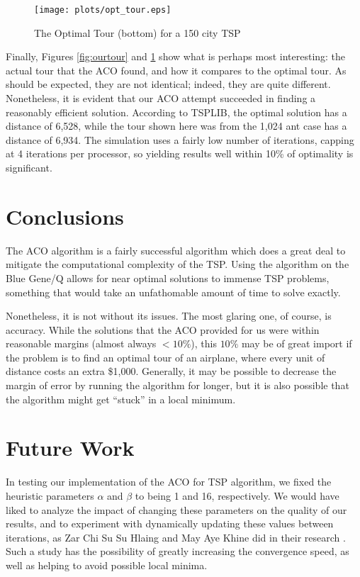 \documentclass[twocolumn]{article}
\begin{document}
\begin{figure}[t]
  \centering
  \texttt{[image: plots/opt\_tour.eps]}
  \caption{The Optimal Tour (bottom) for a 150 city TSP} 
  \label{fig:opttour}
\end{figure}

Finally, Figures \ref{fig:ourtour} and \ref{fig:opttour} show what is perhaps 
most interesting: the actual tour that the ACO found, and how it compares to 
the optimal tour. As should be expected, they are not identical; indeed, 
they are quite different. Nonetheless, it is evident that our ACO attempt succeeded
in finding a reasonably efficient solution. According to TSPLIB, the optimal solution
has a distance of 6,528, while the tour shown here was from the 1,024 ant case
has a distance of 6,934. The simulation uses a fairly low number of iterations, 
capping at 4 iterations per processor, so yielding results well within 10\% of
optimality is significant. 

\section{Conclusions}

The ACO algorithm is a fairly successful algorithm which does a great deal to 
mitigate the computational complexity of the TSP. Using the algorithm on the
Blue Gene/Q allows for near optimal solutions to immense TSP problems, something
that would take an unfathomable amount of time to solve exactly. 

Nonetheless, it is not without its issues. The most glaring one, of course,
is accuracy. While the solutions that the ACO provided for us were within
reasonable margins (almost always $<10\%$), this $10\%$ may be of great 
import if the problem is to find an optimal tour of an airplane, where every
unit of distance costs an extra \$1,000. Generally, it may be possible to 
decrease the margin of error by running the algorithm for longer, but 
it is also possible that the algorithm might get ``stuck'' in a local 
minimum. 

\section{Future Work}

In testing our implementation of the ACO for TSP algorithm, we fixed the 
heuristic parameters $\alpha$ and $\beta$ to being 1 and 16, respectively. We 
would have liked to analyze the impact of changing these parameters on the
quality of our results, and to experiment with dynamically
updating these values between iterations, as Zar Chi Su Su Hlaing and May Aye 
Khine did in their research \cite{ipcsit:aco}. Such a study has the possibility
of greatly increasing the convergence speed, as well as helping to avoid 
possible local minima. 
\end{document}
